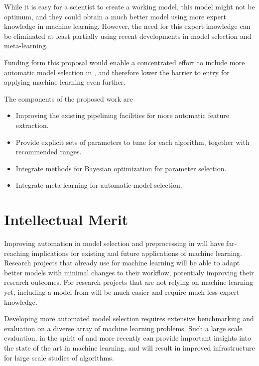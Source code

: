 While it is easy for a scientist to create a working model, this model might not
be optimum, and they could obtain a much better model using more expert knowledge
in machine learning.
However, the need for this expert knowledge can be eliminated at least partially
using recent developments in model selection and meta-learning.

Funding form this proposal would enable a concentrated effort to include more
automatic model selection in \sklearn{}, and therefore lower the barrier to
entry for applying machine learning even further.

The components of the proposed work are
\begin{itemize}
    \item Improving the existing pipelining facilities for more automatic feature extraction.
    \item Provide explicit sets of parameters to tune for each algorithm, together with recommended ranges.
    \item Integrate methods for Bayesian optimization for parameter selection.
    \item Integrate meta-learning for automatic model selection.
\end{itemize}

\section{Intellectual Merit}
Improving automation in model selection and preprocessing in \sklearn{} will have far-reaching
implications for existing and future applications of machine learning.
Research projects that already use \sklearn{} for machine learning will be able to adapt better
models with minimal changes to their workflow, potentialy improving their research outcomes.
For research projects that are not relying on machine learning yet, including a model
from \sklearn{} will be much easier and require much less expert knowledge.

Developing more automated model selection requires extensive benchmarking and evaluation
on a diverse array of machine learning problems. Such a large scale evaluation,
in the spirit of \textcite{caruana2008empirical, caruana2006empirical} and more
recently \textcite{feurer-nips2015} can provide important insights into the state
of the art in machine learning, and will result in improved infrastructure
for large scale studies of algorithms.

